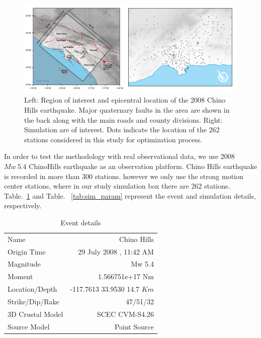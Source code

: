  \begin{figure}[ht]
    \centering
    \includegraphics[width=\textwidth]{figures/pdf/Figure_stations.pdf}
    \caption{Left: Region of interest and epicentral location of the 2008 Chino Hills earthquake. Major quaternary faults in the area are shown in the back along with the main roads and county divisions. Right: Simulation are of interest. Dots indicate the location of the 262 stations considered in this study for optimization process.}
    \label{fig:Figure_stations}
\end{figure}


In order to test the methodology with real observational data, we use 2008 $Mw~5.4$  ChinoHills earthquake as an observation platform. Chino Hills earthquake is recorded in more than 300 stations. however we only use the strong motion center stations, where in our study simulation box there are 262 stations.  Table.~\ref{tab:event_details}  and Table. ~\ref{tab:sim_param} represent the event and simulation details, respectively. 


\begin{table}[ht]
\centering
\caption{Event details}
\label{tab:event_details}
\renewcommand{\arraystretch}{0.75}
\begin{tabular}{lr}
\\ \hline
Name                                 &   Chino Hills                          \\
Origin Time                        & 29 July 2008 , 11:42 AM             \\
Magnitude                          &  Mw 5.4            \\
Moment                             & 1.566751e+17 Nm             \\
Location/Depth                  &  -117.7613 33.9530 14.7 $Km$    \\
Strike/Dip/Rake                 & 47/51/32                                   \\
3D Crustal Model              & SCEC CVM-S4.26                   \\
Source Model                   & Point Source                                  \\ \hline
\end{tabular}
\end{table}


